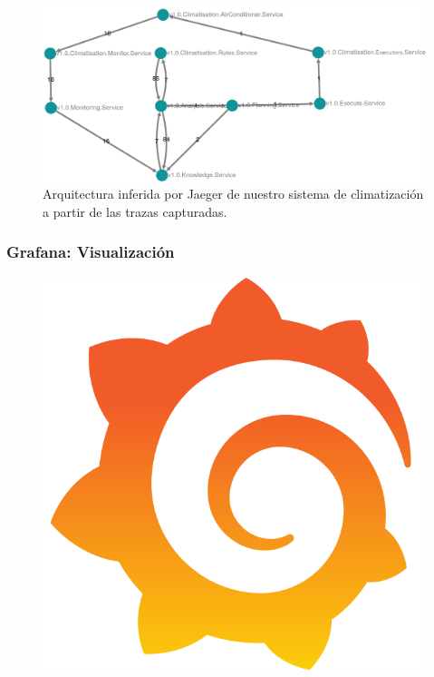 \begin{figure}[htb]
  \hspace{1.25cm}
  \includegraphics[scale=0.3]{cap_despliegue/images/Jaeger-arquitectura-climatizacion}
  \caption{Arquitectura inferida por Jaeger de nuestro sistema de climatización a partir de las trazas capturadas.}
  \label{fig:jaeger-arquitectura-inferida}
\end{figure}

\subsubsection{Grafana: Visualización}

\begin{figure}
  \vspace{-20pt}
  \includegraphics[scale=0.10]{cap_despliegue/images/Grafana_logo}
  \vspace{-20pt}
\end{figure}

